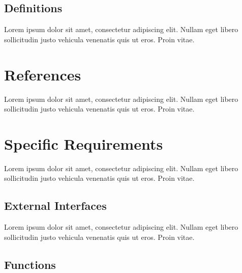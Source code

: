 \documentclass[a4paper]{article}
\begin{document}
            \subsection{Definitions}

            Lorem ipsum dolor sit amet, consectetur adipiscing elit. Nullam eget libero sollicitudin justo vehicula venenatis quis ut eros. Proin vitae.

    \section{References}

    Lorem ipsum dolor sit amet, consectetur adipiscing elit. Nullam eget libero sollicitudin justo vehicula venenatis quis ut eros. Proin vitae.

    \section{Specific Requirements}

    Lorem ipsum dolor sit amet, consectetur adipiscing elit. Nullam eget libero sollicitudin justo vehicula venenatis quis ut eros. Proin vitae.

        \subsection{External Interfaces}

        Lorem ipsum dolor sit amet, consectetur adipiscing elit. Nullam eget libero sollicitudin justo vehicula venenatis quis ut eros. Proin vitae.

        \subsection{Functions}

\end{document}
